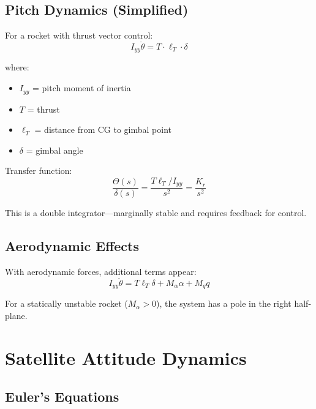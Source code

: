 

\subsection{Pitch Dynamics (Simplified)}

For a rocket with thrust vector control:
\begin{equation}
I_{yy}\ddot{\theta} = T \cdot \ell_T \cdot \delta
\end{equation}

where:
\begin{itemize}
    \item $I_{yy}$ = pitch moment of inertia
    \item $T$ = thrust
    \item $\ell_T$ = distance from CG to gimbal point
    \item $\delta$ = gimbal angle
\end{itemize}

Transfer function:
\begin{equation}
\frac{\Theta(s)}{\delta(s)} = \frac{T\ell_T/I_{yy}}{s^2} = \frac{K_r}{s^2}
\end{equation}

This is a double integrator---marginally stable and requires feedback for control.

\subsection{Aerodynamic Effects}

With aerodynamic forces, additional terms appear:
\begin{equation}
I_{yy}\ddot{\theta} = T\ell_T\delta + M_\alpha\alpha + M_q q
\end{equation}

For a statically unstable rocket ($M_\alpha > 0$), the system has a pole in the right half-plane.

\section{Satellite Attitude Dynamics}
\label{sec:satellite}



\subsection{Euler's Equations}

